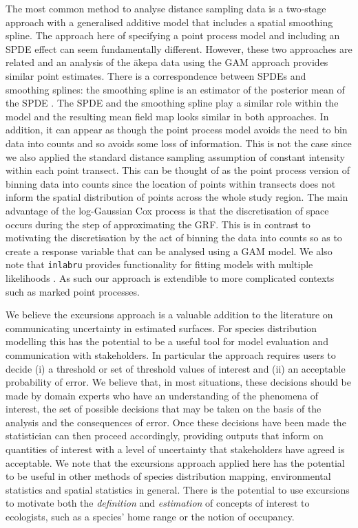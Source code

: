 \documentclass[preprint,12pt]{elsarticle}
\newcommand{\akepa}{\textquotesingle\={a}kepa}  %
\begin{document}
The most common method to analyse distance sampling data is a two-stage approach with a generalised additive model that includes a spatial smoothing spline.  The approach here of specifying a point process model and including an SPDE effect can seem fundamentally different.  However, these two approaches are related and an analysis of the \akepa{} data using the GAM approach provides similar point estimates.  There is a correspondence between SPDEs and smoothing splines: the smoothing spline is an estimator of the posterior mean of the SPDE \citep{kimeldorf_spline_2002}.  The SPDE and the smoothing spline play a similar role within the model and the resulting mean field map looks similar in both approaches.  
In addition, it can appear as though the point process model avoids the need to bin data into counts and so avoids some loss of information. This is not the case since we also applied the standard distance sampling assumption of constant intensity within each point transect.  This can be thought of as the point process version of binning data into counts since the location of points within transects does not inform the spatial distribution of points across the whole study region.  The main advantage of the log-Gaussian Cox process is that the discretisation of space occurs during the step of approximating the GRF.  This is in contrast to motivating the discretisation by the act of binning the data into counts so as to create a response variable that can be analysed using a GAM model.  We also note that \texttt{inlabru} provides functionality for fitting models with multiple likelihoods \citep{bachl_inlabru_2019}.  As such our approach is extendible to more complicated contexts such as marked point processes.    

We believe the excursions approach is a valuable addition to the literature on communicating uncertainty in estimated surfaces.  For species distribution modelling this has the potential to be a useful tool for model evaluation and communication with stakeholders.  In particular the approach requires users to decide (i) a threshold or set of threshold values of interest and (ii) an acceptable probability of error. 
We believe that, in most situations, these decisions should be made by domain experts who have an understanding of the phenomena of interest, the set of possible decisions that may be taken on the basis of the analysis and the consequences of error.  Once these decisions have been made the statistician can then proceed accordingly, providing outputs  that inform on quantities of interest with a level of uncertainty that stakeholders have agreed is acceptable.  We note that the excursions approach applied here has the potential to be useful in other methods of species distribution mapping, environmental statistics and spatial statistics in general.  There is the potential to use excursions to motivate both the \textit{definition} and \textit{estimation} of concepts of interest to ecologists, such as a species' home range or the notion of occupancy. 
\end{document}

